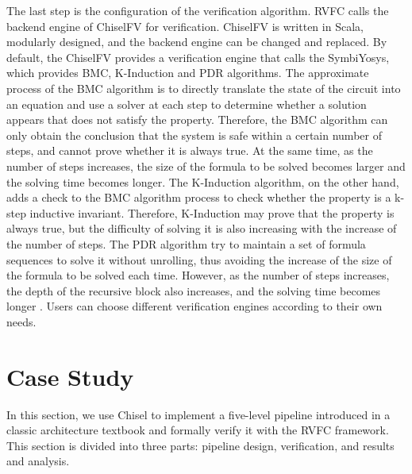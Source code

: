 \documentclass[conference]{IEEEtran}
\theoremstyle{definition}
\begin{document}
The last step is the configuration of the verification algorithm.
RVFC calls the backend engine of ChiselFV for verification. ChiselFV is written in Scala, modularly designed, and the backend engine can be changed and replaced.
By default, the ChiselFV provides a verification engine that calls the SymbiYosys, which provides BMC, K-Induction and PDR algorithms.
The approximate process of the BMC algorithm is to directly translate the state of the circuit into an equation and use a solver at each step to determine whether a solution appears that does not satisfy the property.
Therefore, the BMC algorithm can only obtain the conclusion that the system is safe within a certain number of steps, and cannot prove whether it is always true.
At the same time, as the number of steps increases, the size of the formula to be solved becomes larger and the solving time becomes longer.
The K-Induction algorithm, on the other hand, adds a check to the BMC algorithm process to check whether the property is a k-step inductive invariant.
Therefore, K-Induction may prove that the property is always true, but the difficulty of solving it is also increasing with the increase of the number of steps.
The PDR algorithm try to maintain a set of formula sequences to solve it without unrolling, thus avoiding the increase of the size of the formula to be solved each time.
However, as the number of steps increases, the depth of the recursive block also increases, and the solving time becomes longer \cite{vizel2015boolean}.
Users can choose different verification engines according to their own needs.

\section{Case Study}
In this section, we use Chisel to implement a five-level pipeline introduced in a classic architecture textbook \cite{patterson2017computer} and formally verify it with the RVFC framework.
This section is divided into three parts: pipeline design, verification, and results and analysis.
\end{document}
